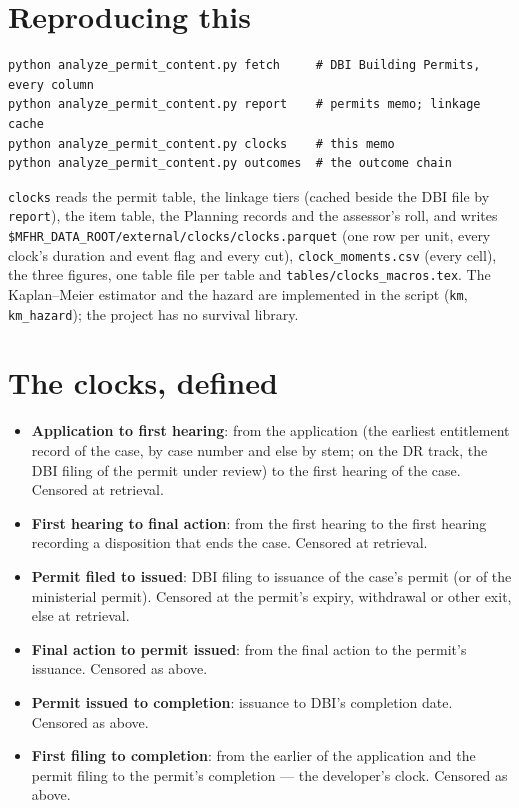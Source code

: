 \documentclass[11pt]{article}
\begin{document}
\section{Reproducing this}
\label{sec:repro}

\begin{verbatim}
python analyze_permit_content.py fetch     # DBI Building Permits, every column
python analyze_permit_content.py report    # permits memo; linkage cache
python analyze_permit_content.py clocks    # this memo
python analyze_permit_content.py outcomes  # the outcome chain
\end{verbatim}

\texttt{clocks} reads the permit table, the linkage tiers (cached beside the DBI file by
\texttt{report}), the item table, the Planning records and the assessor's roll, and writes
\texttt{\$MFHR\_DATA\_ROOT/external/clocks/clocks.parquet} (one row per unit, every clock's
duration and event flag and every cut), \texttt{clock\_moments.csv} (every cell), the three
figures, one table file per table and \texttt{tables/clocks\_macros.tex}. The Kaplan--Meier
estimator and the hazard are implemented in the script (\texttt{km}, \texttt{km\_hazard}); the
project has no survival library.

\appendix
\section{The clocks, defined}
\label{sec:defs}

\begin{itemize}
\item \textbf{Application to first hearing}: from the application (the earliest entitlement
record of the case, by case number and else by stem; on the DR track, the DBI filing of the permit
under review) to the first hearing of the case. Censored at retrieval.
\item \textbf{First hearing to final action}: from the first hearing to the first hearing
recording a disposition that ends the case. Censored at retrieval.
\item \textbf{Permit filed to issued}: DBI filing to issuance of the case's permit (or of the
ministerial permit). Censored at the permit's expiry, withdrawal or other exit, else at retrieval.
\item \textbf{Final action to permit issued}: from the final action to the permit's issuance.
Censored as above.
\item \textbf{Permit issued to completion}: issuance to DBI's completion date. Censored as above.
\item \textbf{First filing to completion}: from the earlier of the application and the permit
filing to the permit's completion --- the developer's clock. Censored as above.
\end{itemize}
\end{document}
